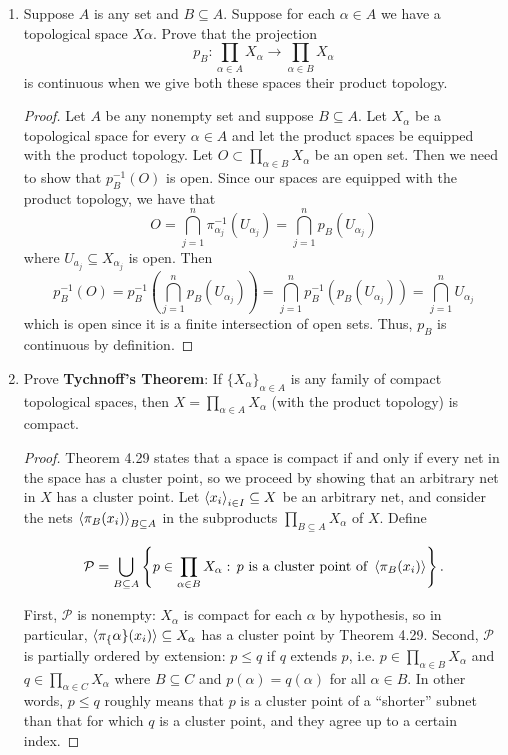 \documentclass[11pt,oneside,english]{amsart}
\theoremstyle{definition}
\newcommand{\MC}[1]{\mathcal{#1}}
\def\<#1>{\mathinner{\langle#1\rangle}}
\begin{document}
\rightline{\today}



\vspace{5mm}
\begin{enumerate}
\itemsep7mm



\item Suppose $A$ is any set and $B\subseteq A$. Suppose for each $\alpha\in A$ we have a topological space $X\alpha$. Prove that the projection
\[
p_B:\prod_{\alpha\in A}X_\alpha\rightarrow\prod_{\alpha\in B}X_\alpha
\]
is continuous when we give both these spaces their product topology.

\begin{proof}
Let $A$ be any nonempty set and suppose $B\subseteq A$. Let $X_\alpha$ be a topological space for every $\alpha\in A$ and let the product spaces be equipped with the product topology. Let $O\subset\prod_{\alpha\in B}X_\alpha$ be an open set. Then we need to show that $p_B^{-1}(O)$ is open. Since our spaces are equipped with the product topology, we have that
\[
O=\bigcap_{j=1}^n\pi^{-1}_{\alpha_j}(U_{\alpha_j})=\bigcap_{j=1}^n{p_B}(U_{\alpha_j})
\]
where $U_{a_j}\subseteq X_{\alpha_j}$ is open. Then
\[
p_B^{-1}(O)=p_B^{-1}\left(\bigcap_{j=1}^n{p_B}(U_{\alpha_j})\right)=\bigcap_{j=1}^np_B^{-1}(p_B(U_{\alpha_j}))=\bigcap_{j=1}^nU_{\alpha_j}
\]
which is open since it is a finite intersection of open sets. Thus, $p_B$ is continuous by definition.
\end{proof}

\item Prove \textbf{Tychnoff's Theorem}: If $\{X_\alpha\}_{\alpha\in A}$ is any family of compact topological spaces, then $X=\prod_{\alpha\in A}X_\alpha$ (with the product topology) is compact.

\begin{proof}
Theorem 4.29 states that a space is compact if and only if every net in the space has a cluster point, so we proceed by showing that an arbitrary net in $X$ has a cluster point. Let $\<x_i>_{i\in I}\subseteq X$ be an arbitrary net, and consider the nets $\<\pi_B(x_i)>_{B\subseteq A}$ in the subproducts $\prod_{B\subseteq A}X_\alpha$ of $X$. Define

\[
\MC{P}=\bigcup_{B\subseteq A}\left\{p\in\prod_{\alpha\in B}X_\alpha:\,p\text{ is a cluster point of }\<\pi_B(x_i)>\right\}.
\]

First, $\MC{P}$ is nonempty: $X_\alpha$ is compact for each $\alpha$ by hypothesis, so in particular, $\<\pi_{\{\alpha\}}(x_i)>\subseteq X_\alpha$ has a cluster point by Theorem 4.29. Second, $\MC{P}$ is partially ordered by extension: $p\leq q$ if $q$ extends $p$, i.e. $p\in\prod_{\alpha\in B}X_\alpha$ and $q\in\prod_{\alpha\in C}X_\alpha$ where $B\subseteq C$ and $p(\alpha)=q(\alpha)$ for all $\alpha\in B$. In other words, $p\leq q$ roughly means that $p$ is a cluster point of a ``shorter'' subnet than that for which $q$ is a cluster point, and they agree up to a certain index.


\end{proof}
\end{enumerate}
\end{document}
